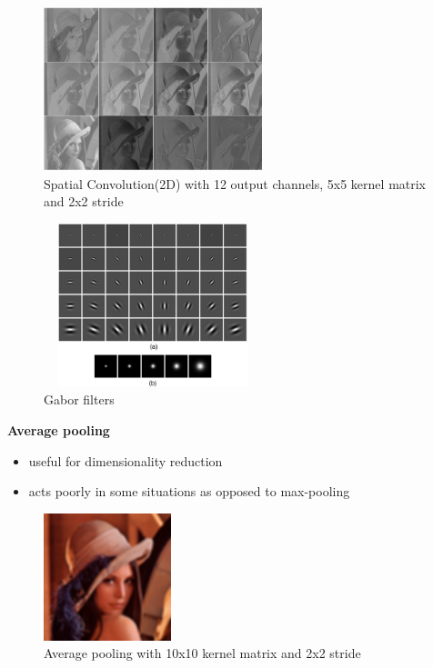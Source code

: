 \begin{figure}[h]
	\begin{center}
		\includegraphics[width=240px,height=180px]{src/img/state/lena-spatialconv22}
		\caption{Spatial Convolution(2D) with 12 output channels, 5x5 kernel matrix and 2x2 stride} \label{fig:lena-spatialconv}
    \end{center}
\end{figure}

\begin{figure}[h]
	\begin{center}
		\includegraphics[width=240px,height=180px]{src/img/state/gabor}
		\caption{Gabor filters\cite{gabor}} \label{fig:gabor.png}
    \end{center}
\end{figure}

\newpage
\textbf{Average pooling}
\begin{itemize}
	\item{useful for dimensionality reduction}
	\item{acts poorly in some situations as opposed to max-pooling}
\end{itemize}
\begin{figure}[h]
	\begin{center}
		\includegraphics[width=140px,height=140px]{src/img/state/lena-avgpooling}
		\caption{Average pooling with 10x10 kernel matrix and 2x2 stride} \label{fig:lena-avgpooling}
    \end{center}
\end{figure}



